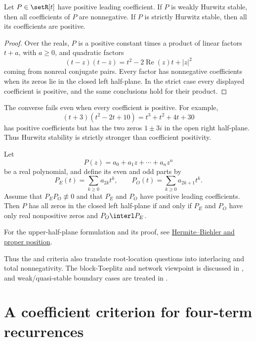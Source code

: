 \begin{proposition}
\label{hurwitzImpliesCoefficientPositivity}
Let $P\in\setR[t]$ have positive leading coefficient.  If $P$ is weakly
Hurwitz stable, then all coefficients of $P$ are nonnegative.  If $P$ is
strictly Hurwitz stable, then all its coefficients are positive.
\end{proposition}

\begin{proof}
Over the reals, $P$ is a positive constant times a product of linear factors
$t+a$, with $a\geq 0$, and quadratic factors
\[
 (t-z)(t-\overline z)
 =t^2-2\operatorname{Re}(z)t+|z|^2
\]
coming from nonreal conjugate pairs.  Every factor has nonnegative
coefficients when its zeros lie in the closed left half-plane.  In the strict
case every displayed coefficient is positive, and the same conclusions hold
for their product.
\end{proof}

The converse fails even when every coefficient is positive.  For example,
\[
 (t+3)(t^2-2t+10)=t^3+t^2+4t+30
\]
has positive coefficients but has the two zeros $1\pm3i$ in the open right
half-plane.  Thus Hurwitz stability is strictly stronger than coefficient
positivity.

\begin{theorem}
\label{hermiteBiehlerTheorem}
Let
\[
  P(z)=a_0+a_1z+\dotsb+a_nz^n
\]
be a real polynomial, and define its even and odd parts by
\[
  P_E(t)=\sum_{k\geq 0} a_{2k}t^k,
  \qquad
  P_O(t)=\sum_{k\geq 0} a_{2k+1}t^k.
\]
Assume that $P_E P_O\not\equiv 0$ and that $P_E$ and $P_O$ have
positive leading coefficients.  Then $P$ has all zeros in the closed
left half-plane if and only if $P_E$ and $P_O$ have only real
nonpositive zeros and $P_O \interl P_E$.
\end{theorem}

For the upper-half-plane formulation and its proof, see
\hyperref[hermiteBiehler]{Hermite--Biehler and proper position}.

Thus the  and  criteria
also translate root-location questions into interlacing and total
nonnegativity.  The block-Toeplitz and network viewpoint is discussed
in \cite[Sec.~4]{Angarone2023x}, and weak/quasi-stable boundary cases
are treated in \cite{AdmGarloffTyaglov2017}.



\section[interlacingFourTermRecurrences]{A coefficient criterion for four-term recurrences}

